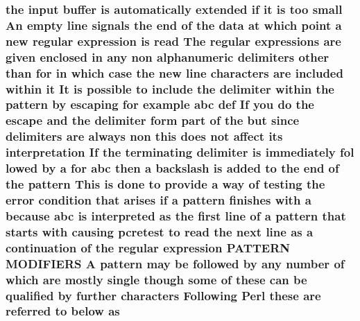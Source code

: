 \subsubsection[{\texorpdfstring{as}{as}}]{\setlength{\rightskip}{0pt plus 5cm}the {\bf input} {\bf buffer} {\bf is} automatically extended {\bf if} {\bf it} {\bf is} too small An {\bf empty} {\bf line} signals the {\bf end} {\bf of} the {\bf data} at {\bf which} {\bf point} {\bf a} new regular {\bf expression} {\bf is} {\bf read} The regular {\bf expressions} {\bf are} {\bf given} enclosed {\bf in} {\bf any} non {\bf alphanumeric} delimiters other {\bf than} for {\bf in} {\bf which} {\bf case} the new {\bf line} {\bf characters} {\bf are} {\bf included} within {\bf it} It {\bf is} {\bf possible} {\bf to} {\bf include} the delimiter within the {\bf pattern} by escaping for {\bf example} {\bf abc} def If you {\bf do} the escape and the delimiter form part {\bf of} the but since delimiters {\bf are} always non {\bf this} does {\bf not} affect its interpretation If the terminating delimiter {\bf is} immediately fol lowed by {\bf a} for {\bf abc} then {\bf a} {\bf backslash} {\bf is} added {\bf to} the {\bf end} {\bf of} the {\bf pattern} This {\bf is} {\bf done} {\bf to} provide {\bf a} {\bf way} {\bf of} testing the {\bf error} condition that {\bf arises} {\bf if} {\bf a} {\bf pattern} finishes {\bf with} {\bf a} because {\bf abc} {\bf is} interpreted as the {\bf first} {\bf line} {\bf of} {\bf a} {\bf pattern} that starts {\bf with} causing {\bf pcretest} {\bf to} {\bf read} the next {\bf line} as {\bf a} continuation {\bf of} the regular {\bf expression} P\+A\+T\+T\+E\+RN M\+O\+D\+I\+F\+I\+E\+RS {\bf A} {\bf pattern} may {\bf be} followed by {\bf any} {\bf number} {\bf of} {\bf which} {\bf are} mostly single {\bf though} some {\bf of} these {\bf can} {\bf be} qualified by further {\bf characters} Following {\bf Perl} these {\bf are} referred {\bf to} {\bf below} as}\hypertarget{pcretest_8txt_a7681723cb91eaa99771ee87f8465c1aa}{}\label{pcretest_8txt_a7681723cb91eaa99771ee87f8465c1aa}
